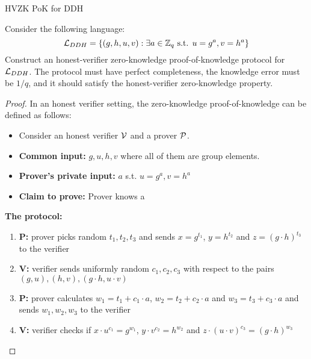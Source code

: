 \begin{solution}{HVZK PoK for DDH}\label{ques:21}
    \begin{question}
    Consider the following language:
    \begin{equation}
        \mathcal{L}_{DDH} = \{(g,h,u,v): \exists a \in \mathbb{Z}_q \text{ s.t. }u = g^a , v = h^a \}
    \end{equation}
    Construct an honest-verifier zero-knowledge proof-of-knowledge protocol for $\mathcal{L}_{DDH}$. The protocol must have perfect completeness, the knowledge error must be $1/q$, and it should satisfy the honest-verifier zero-knowledge property.
    \end{question}
    \tcblower{}
    \begin{proof}
    In an honest verifier setting, the zero-knowledge proof-of-knowledge can be defined as follows: 
    \begin{itemize}
        \item Consider an honest verifier $\mathcal{V}$ and a prover $\mathcal{P}$.
        \item \textbf{Common input:} $g, u, h, v$ where all of them are group elements.
        \item \textbf{Prover's private input:} $a$ s.t. $u = g^a , v = h^a$
        \item \textbf{Claim to prove:} Prover knows a
    \end{itemize}

    \textbf{The protocol:}
    \begin{enumerate}
        \item \textbf{P:} prover picks random $t_1, t_2, t_3$ and sends $x = g^{t_1}$, $y = h^{t_2}$ and $z = (g \cdot h)^{t_3}$ to the verifier
        \item \textbf{V:} verifier sends uniformly random $c_1, c_2, c_3$ with respect to the pairs $(g,u),(h,v),(g \cdot h,u \cdot v)$
        \item \textbf{P:} prover calculates $w_1 = t_1 +c_1\cdot a$, $w_2 = t_2 +c_2\cdot a$ and $w_3 = t_3 +c_3\cdot a$ and sends $w_1, w_2, w_3$ to the verifier
        \item \textbf{V:} verifier checks if $x \cdot u^{c_1} = g^{w_1}$, $y \cdot v^{c_2} = h^{w_2}$ and $z \cdot (u \cdot v)^{c_3} = (g \cdot h)^{w_3}$
    \end{enumerate}


\end{proof}
\end{solution}
